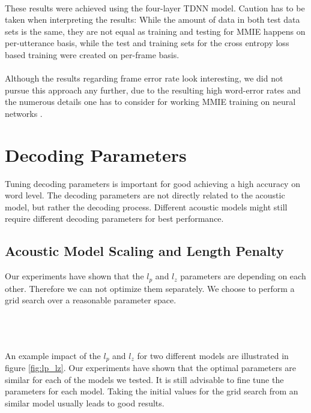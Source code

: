 \fi
\\ These results were achieved using the four-layer TDNN model. Caution has to be taken when interpreting the results: While the amount of data in both test data sets is the same, they are not equal as training and testing for MMIE happens on per-utterance basis, while the test and training sets for the cross entropy loss based training were created on per-frame basis. \\ \\
Although the results regarding frame error rate look interesting, we did not pursue this approach any further, due to the resulting high word-error rates and the numerous details one has to consider for working MMIE training on neural networks \cite{su2013error}.

\section{Decoding Parameters}
Tuning decoding parameters is important for good achieving a high accuracy on word level. The decoding parameters are not directly related to the acoustic model, but rather the decoding process. Different acoustic models might still require different decoding parameters for best performance. 
\subsection{Acoustic Model Scaling and Length Penalty}
Our experiments have shown that the $l_p$ and $l_z$ parameters are depending on each other. Therefore we can not optimize them separately. We choose to perform a grid search over a reasonable parameter space. \\ \\
\begin{minipage}{\linewidth}
\centering
{}
\label{fig:lp_lz}
\end{minipage}
\\ \\
An example impact of the $l_p$ and $l_z$ for two different models are illustrated in figure \ref{fig:lp_lz}. Our experiments have shown that the optimal parameters are similar for each of the models we tested. It is still advisable to fine tune the parameters for each model. Taking the initial values for the grid search from an similar model usually leads to good results.

